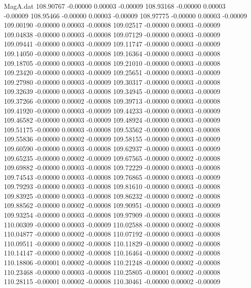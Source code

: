 \begin{filecontents}{MagA.dat}
 108.90767   -0.00000    0.00003   -0.00009
 108.93168   -0.00000    0.00003   -0.00009
 108.95466   -0.00000    0.00003   -0.00009
 108.97775   -0.00000    0.00003   -0.00009
 109.00190   -0.00000    0.00003   -0.00008
 109.02517   -0.00000    0.00003   -0.00009
 109.04838   -0.00000    0.00003   -0.00008
 109.07129   -0.00000    0.00003   -0.00009
 109.09441   -0.00000    0.00003   -0.00009
 109.11747   -0.00000    0.00003   -0.00009
 109.14050   -0.00000    0.00003   -0.00008
 109.16364   -0.00000    0.00003   -0.00008
 109.18705   -0.00000    0.00003   -0.00008
 109.21010   -0.00000    0.00003   -0.00008
 109.23420   -0.00000    0.00003   -0.00009
 109.25651   -0.00000    0.00003   -0.00009
 109.27980   -0.00000    0.00003   -0.00009
 109.30317   -0.00000    0.00003   -0.00008
 109.32639   -0.00000    0.00003   -0.00008
 109.34945   -0.00000    0.00003   -0.00009
 109.37266   -0.00000    0.00002   -0.00008
 109.39713   -0.00000    0.00003   -0.00008
 109.41920   -0.00000    0.00003   -0.00009
 109.44233   -0.00000    0.00003   -0.00009
 109.46582   -0.00000    0.00003   -0.00009
 109.48924   -0.00000    0.00003   -0.00009
 109.51175   -0.00000    0.00003   -0.00008
 109.53562   -0.00000    0.00003   -0.00008
 109.55836   -0.00000    0.00002   -0.00009
 109.58155   -0.00000    0.00003   -0.00009
 109.60590   -0.00000    0.00003   -0.00008
 109.62937   -0.00000    0.00003   -0.00009
 109.65235   -0.00000    0.00002   -0.00009
 109.67565   -0.00000    0.00002   -0.00008
 109.69882   -0.00000    0.00003   -0.00008
 109.72229   -0.00000    0.00003   -0.00008
 109.74543   -0.00000    0.00003   -0.00008
 109.76865   -0.00000    0.00003   -0.00009
 109.79293   -0.00000    0.00003   -0.00008
 109.81610   -0.00000    0.00003   -0.00008
 109.83925   -0.00000    0.00003   -0.00008
 109.86232   -0.00000    0.00002   -0.00008
 109.88562   -0.00000    0.00002   -0.00008
 109.90951   -0.00000    0.00003   -0.00009
 109.93254   -0.00000    0.00003   -0.00008
 109.97909   -0.00000    0.00003   -0.00008
 110.00309   -0.00000    0.00003   -0.00009
 110.02588   -0.00000    0.00002   -0.00008
 110.04877   -0.00000    0.00002   -0.00008
 110.07192   -0.00000    0.00003   -0.00008
 110.09511   -0.00000    0.00002   -0.00008
 110.11829   -0.00000    0.00002   -0.00008
 110.14147   -0.00000    0.00002   -0.00008
 110.16464   -0.00000    0.00002   -0.00008
 110.18806   -0.00001    0.00002   -0.00008
 110.21248   -0.00000    0.00002   -0.00008
 110.23468   -0.00000    0.00003   -0.00008
 110.25805   -0.00001    0.00002   -0.00008
 110.28115   -0.00001    0.00002   -0.00008
 110.30461   -0.00000    0.00002   -0.00009

\end{filecontents}
